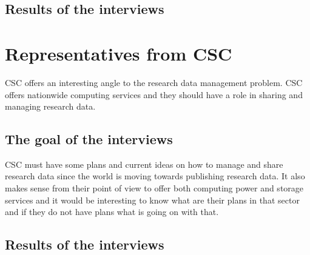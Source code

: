 \subsection{Results of the interviews}

\section{Representatives from CSC}

CSC offers an interesting angle to the research data management problem. CSC
offers nationwide computing services and they should have a role in sharing and
managing research data.

\subsection{The goal of the interviews}

CSC must have some plans and current ideas on how to manage and share research
data since the world is moving towards publishing research data. It also makes
sense from their point of view to offer both computing power and storage
services and it would be interesting to know what are their plans in that
sector and if they do not have plans what is going on with that.

\subsection{Results of the interviews}

